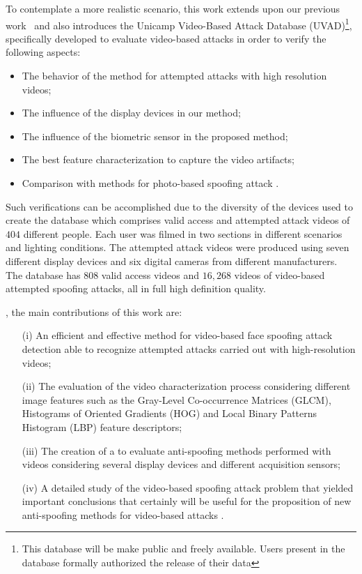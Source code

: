 \documentclass[journal]{IEEEtran}
\providecommand{\rv}[1]{{\protect\color{black}{#1}}}
\providecommand{\bmark}[1]{{\protect\color{black}{#1}}}
\begin{document}
To contemplate a more realistic scenario, this work extends upon our previous work~\cite{Pinto:SIBGRAPI:2012} and also introduces the Unicamp Video-Based Attack Database (UVAD)\footnote{This database will be make public and freely available. Users present in the database formally authorized the release of their data \rv{for scientific purposes.}}, specifically developed to evaluate video-based attacks in order to verify the following aspects:
%
\begin{itemize}
	\item The behavior of the method for attempted attacks with high resolution videos;
	\item The influence of the display devices in our method;
	\item The influence of the biometric sensor in the proposed method;
	\item The best feature characterization to capture the video artifacts;
	\item Comparison with \bmark{one of the best anti-spoofing} methods for photo-based spoofing attack \rv{of notice}.
\end{itemize}

Such verifications can be accomplished due to the diversity of the devices used to create the database which comprises valid access and attempted attack videos of $404$ different people. Each user was filmed in two sections in different scenarios and lighting conditions. The attempted attack videos were produced using seven different display devices and six digital cameras from different manufacturers. The database has $808$ valid access videos and $16,268$ videos of video-based attempted spoofing attacks, all in full high definition quality. 

\rv{In summary}, the main contributions of this work are:
%
\begin{enumerate}
	\item[(i)] An efficient and effective method for video-based face spoofing attack detection able to recognize attempted attacks carried out with high-resolution videos;
	\item[(ii)] The {evaluation of the video characterization process considering different image features such as} the Gray-Level Co-occurrence Matrices (GLCM), Histograms of Oriented Gradients (HOG) and Local Binary Patterns Histogram (LBP) feature descriptors;
	\item[(iii)] The creation of a \bmark{large and publicly available benchmark} to evaluate anti-spoofing methods performed with videos considering several display devices and different acquisition sensors;
	\item[(iv)] A detailed study of the video-based spoofing attack problem that yielded important conclusions that certainly will be useful for the proposition of new anti-spoofing methods for video-based attacks \rv{not only in the biometric domain but also in other applications analyzing video recapture footprints}.
\end{enumerate}
\end{document}
